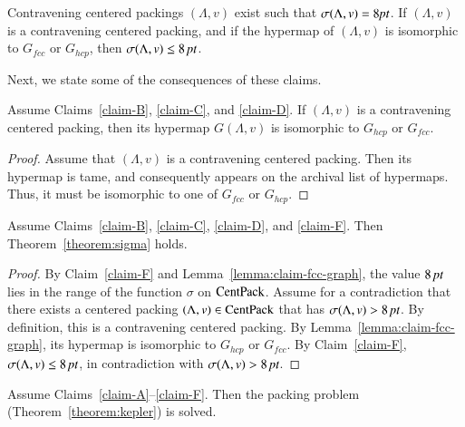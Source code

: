
\begin{claim}\label{claim-F}
Contravening centered packings $(\Lambda,v)$ exist such that
$\sigma(\Lambda,v)=8\hbox{\it pt}$. If $(\Lambda,v)$ is a contravening centered packing, and
if the hypermap of $(\Lambda,v)$ is isomorphic to $G_{fcc}$ or $G_{hcp}$,
then $\sigma(\Lambda,v) \le 8\,\hbox{\it pt}$.
\end{claim} %

Next, we state some of the consequences of these claims.

\begin{lemma}\label{lemma:claim-fcc-graph}
Assume Claims~\ref{claim-B}, \ref{claim-C}, and \ref{claim-D}. If
$(\Lambda,v)$ is a contravening centered packing, then its hypermap $G(\Lambda,v)$
is isomorphic to $G_{hcp}$ or $G_{fcc}$.
\end{lemma}

\begin{proof} Assume that $(\Lambda,v)$ is a contravening centered packing.  Then its hypermap is tame, and consequently appears on the
archival list of hypermaps.  Thus, it must be isomorphic to one of
$G_{fcc}$ or $G_{hcp}$.
\end{proof}

\begin{lemma}\label{lemma:claim-sigma}
Assume Claims~\ref{claim-B}, \ref{claim-C}, \ref{claim-D}, and
\ref{claim-F}. Then Theorem~\ref{theorem:sigma} holds.
\end{lemma}

\begin{proof}
By Claim~\ref{claim-F} and Lemma~\ref{lemma:claim-fcc-graph}, the
value $8\,\hbox{\it pt}$ lies in the range of the function $\sigma$ on
${\operatorname{CentPack}}$.   Assume for a contradiction that there exists a
centered packing $(\Lambda,v)\in {\operatorname{CentPack}}$ that has $\sigma(\Lambda,v)>8\,\hbox{\it pt}$. By
definition, this is a contravening centered packing. By
Lemma~\ref{lemma:claim-fcc-graph}, its hypermap is isomorphic to
$G_{hcp}$ or $G_{fcc}$.  By Claim~\ref{claim-F}, $\sigma(\Lambda,v)\le
8\,\hbox{\it pt}$, in contradiction with $\sigma(\Lambda,v)>8\,\hbox{\it pt}$.
\end{proof}


\begin{lemma}
Assume Claims~\ref{claim-A}--\ref{claim-F}. Then the packing problem
(Theorem~\ref{theorem:kepler}) is solved.
\end{lemma}

